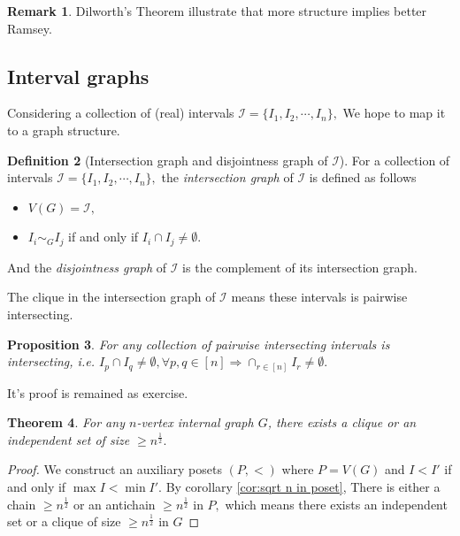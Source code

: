 \documentclass{article}
\newtheorem{theorem}{Theorem}[section]
\newtheorem{proposition}[theorem]{Proposition}
\theoremstyle{definition}
\newtheorem{remark}[theorem]{Remark}
\newtheorem{definition}[theorem]{Definition}
\begin{document}
\begin{remark}
    Dilworth's Theorem illustrate that more structure implies better Ramsey.
\end{remark}

\subsection{Interval graphs}

Considering a collection of (real) intervals $\mathcal{I}=\{I_1,I_2,\cdots,I_n\},$ We hope to map it to a graph structure.

\begin{definition}[Intersection graph and disjointness graph of $\mathcal{I}$]
    For a collection of intervals $\mathcal{I}=\{I_1,I_2,\cdots,I_n\},$ the \emph{intersection graph} of $\mathcal{I}$ is defined as follows
    \begin{itemize}
        \item $V(G)=\mathcal{I},$

        \item $I_i\sim_{G}I_j$ if and only if $I_i\cap I_j\neq \emptyset.$
    \end{itemize}
    And the \emph{disjointness graph} of $\mathcal{I}$ is the complement of its intersection graph.
\end{definition}

The clique in the intersection graph of $\mathcal{I}$ means these intervals is pairwise intersecting.

\begin{proposition}
    For any collection of pairwise intersecting intervals is intersecting, i.e. $I_p\cap I_q\neq \emptyset,\forall p,q\in [n]\Rightarrow\cap_{r\in [n]}I_r\neq \emptyset.$ 
\end{proposition}

It's proof is remained as exercise.

\begin{theorem}
    For any $n$-vertex internal graph $G$, there exists a clique or an independent set of size $\geq n^\frac{1}{2}.$
\end{theorem}

\begin{proof}
    We construct an auxiliary posets $(P,<)$ where $P=V(G)$ and $I<I'$ if and only if $\max I<\min I'.$ By corollary \ref{cor:sqrt n in poset}, There is either a chain $\geq n^\frac{1}{2}$ or an antichain $\geq n^\frac{1}{2}$ in $P,$ which means there exists an independent set or a clique of size $\geq n^\frac{1}{2}$ in $G$
\end{proof}
\end{document}
